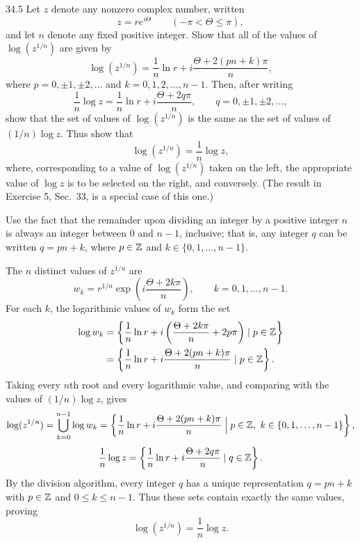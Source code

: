 \documentclass[11pt,oneside]{article}
\begin{document}
\begin{exercise}{34.5}
Let \(z\) denote any nonzero complex number, written
\[
    z=re^{i\Theta}
    \qquad(-\pi<\Theta\le\pi),
\]
and let \(n\) denote any fixed positive integer. Show that all of the values of \(\log(z^{1/n})\) are given by
\[
    \log(z^{1/n})
    =\frac1n\ln r
    +i\frac{\Theta+2(pn+k)\pi}{n},
\]
where \(p=0, \pm1, \pm2, \ldots\) and \(k=0, 1, 2, \ldots, n-1\). Then, after writing
\[
    \frac1n\log z
    =\frac1n\ln r+i\frac{\Theta+2q\pi}{n},
    \qquad q=0, \pm1, \pm2, \ldots,
\]
show that the set of values of \(\log(z^{1/n})\) is the same as the set of values of \((1/n)\log z\). Thus show that
\[
    \log(z^{1/n})=\frac1n\log z,
\]
where, corresponding to a value of \(\log(z^{1/n})\) taken on the left, the appropriate value of \(\log z\) is to be selected on the right, and conversely. (The result in Exercise 5, Sec.~33, is a special case of this one.)
\begin{suggestion}
Use the fact that the remainder upon dividing an integer by a positive integer \(n\) is always an integer between \(0\) and \(n-1\), inclusive; that is, any integer \(q\) can be written \(q=pn+k\), where \(p\in\mathbb{Z}\) and \(k\in\{0, 1, \ldots, n-1\}\).
\end{suggestion}
\end{exercise}

\begin{solution}
The $n$ distinct values of $z^{1/n}$ are
\[
    w_k=r^{1/n}\exp\left(i\frac{\Theta+2k\pi}{n}\right),
    \qquad k=0, 1, \ldots, n-1.
\]
For each $k$, the logarithmic values of $w_k$ form the set
\[
\begin{aligned}
    \log w_k
    &=\left\{\frac1n\ln r
      +i\left(\frac{\Theta+2k\pi}{n}+2p\pi\right)\mid p\in\mathbb{Z}\right\}\\
    &=\left\{\frac1n\ln r
      +i\frac{\Theta+2(pn+k)\pi}{n}\mid p\in\mathbb{Z}\right\}.
\end{aligned}
\]
Taking every $n$th root and every logarithmic value, and comparing with the values of $(1/n)\log z$, gives
\[
\begin{gathered}
    \log(z^{1/n})
    =\bigcup_{k=0}^{n-1}\log w_k
    =\left\{\frac1n\ln r+i\frac{\Theta+2(pn+k)\pi}{n}
       \mathrel{\Big|}p\in\mathbb{Z},\ k\in\{0, 1, \ldots, n-1\}\right\},\\[3pt]
    \frac1n\log z
    =\left\{\frac1n\ln r+i\frac{\Theta+2q\pi}{n}\mid q\in\mathbb{Z}\right\}.
\end{gathered}
\]
By the division algorithm, every integer $q$ has a unique representation $q=pn+k$ with $p\in\mathbb{Z}$ and $0\le k\le n-1$. Thus these sets contain exactly the same values, proving
\[
    \boxed{\log(z^{1/n})=\frac1n\log z}.
\]
\end{solution}
\end{document}
